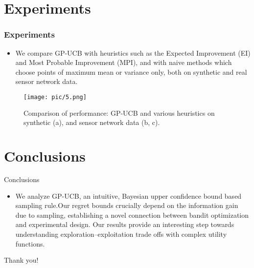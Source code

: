 \documentclass[10pt]{beamer}
\begin{document}
\section{Experiments}
\begin{frame}
\frametitle{Experiments}
\begin{itemize}
    \item We  compare GP-UCB with  heuristics  such  as  the Expected   Improvement   (EI)   and   Most   Probable Improvement  (MPI),  and  with  naive  methods  which choose  points  of  maximum  mean  or  variance  only, both on synthetic and real sensor network data.
\end{itemize}
\end{frame}

\begin{frame}
    \begin{figure}
        \texttt{[image: pic/5.png]}
        \caption{Comparison of performance: GP-UCB and various heuristics on synthetic (a), and sensor network data (b, c).}
    \end{figure}
\end{frame}

\section{Conclusions}
\begin{frame}{Conclusions}
    \begin{itemize}
        \item We analyze GP-UCB, an intuitive, Bayesian upper confidence bound based sampling rule.Our regret bounds crucially depend on the information gain due to sampling, establishing a novel connection between bandit optimization and experimental design. Our results provide an interesting step  towards  understanding  exploration–exploitation trade offs with complex utility functions.
    \end{itemize}\vspace{.2cm}
\end{frame}

\begin{frame}
    \begin{center}
    {\large Thank you!}
\end{center}
    
\scriptsize
    
    
\end{frame}
\end{document}

